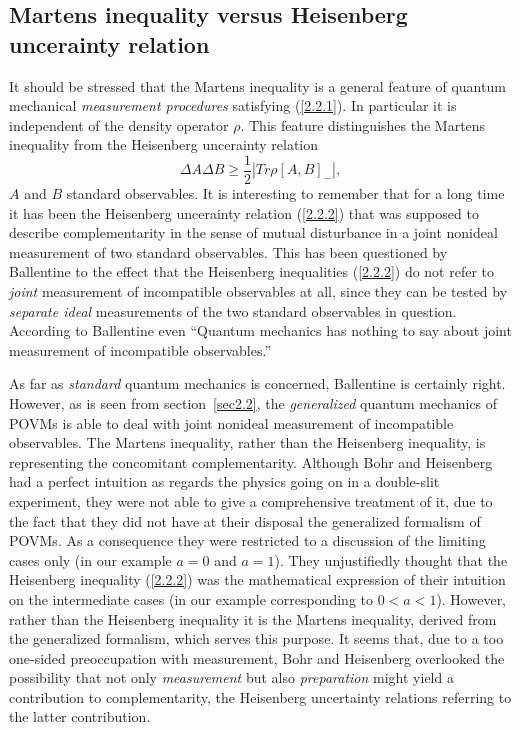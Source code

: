 \documentclass{ws-procs975x65}
\begin{document}
{\subsection{Martens inequality
versus Heisenberg uncerainty relation}\label{sec2.3} It should be
stressed that the Martens inequality is a general feature of
quantum mechanical \textit{measurement procedures} satisfying
(\ref{2.2.1}). In particular it is independent of the density
operator $\rho$. This feature distinguishes the Martens inequality
from the Heisenberg uncerainty relation
\begin{equation}\label{2.2.2}\Delta A \Delta B \geq \frac{1}{2} | Tr\rho
[A,B]_-|,\end{equation}
 $A$ and $B$ standard observables. It is
interesting to remember that for a long time it has been the
Heisenberg uncerainty relation (\ref{2.2.2}) that was supposed to
describe complementarity in the sense of mutual disturbance in a
joint nonideal measurement of two standard observables. This has
been questioned by Ballentine\cite{Bal70} to the effect that the
Heisenberg inequalities (\ref{2.2.2}) do not refer to
\textit{joint} measurement of incompatible observables at all,
since they can be tested by \textit{separate ideal} measurements
of the two standard observables in question. According to
Ballentine even ``Quantum mechanics has nothing to say about joint
measurement of incompatible observables.''

As far as \textit{standard} quantum mechanics is concerned,
Ballentine is certainly right. However, as is seen from
section~\ref{sec2.2}, the \textit{generalized} quantum mechanics
of POVMs is able to deal with joint nonideal measurement of
incompatible observables. The Martens inequality, rather than the
Heisenberg inequality, is representing the concomitant
complementarity. Although Bohr and Heisenberg had a perfect
intuition as regards the physics going on in a double-slit
experiment, they were not able to give a comprehensive treatment
of it, due to the fact that they did not have at their disposal
the generalized formalism of POVMs. As a consequence they were
restricted to a discussion of the limiting cases only (in our
example $a=0$ and $a=1$). They unjustifiedly thought\cite{dM2000}
that the Heisenberg inequality (\ref{2.2.2}) was the mathematical
expression of their intuition on the intermediate cases (in our
example corresponding to $0<a<1$). However, rather than the
Heisenberg inequality it is the Martens inequality, derived from
the generalized formalism, which serves this purpose. It seems
that, due to a too one-sided preoccupation with measurement, Bohr
and Heisenberg overlooked the possibility that not only
\textit{measurement} but also \textit{preparation} might yield a
contribution to complementarity, the Heisenberg uncertainty
relations referring to the latter contribution.

}
\end{document}
